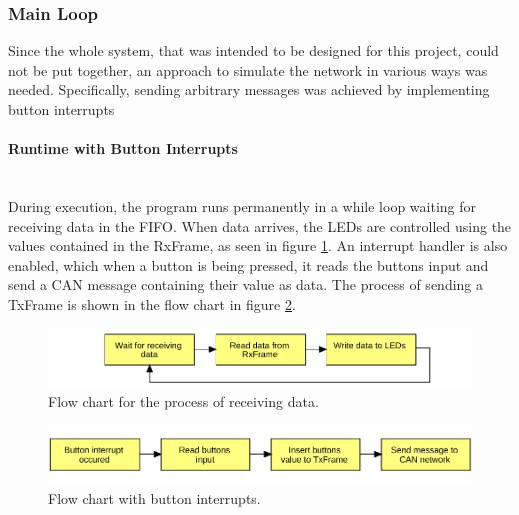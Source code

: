 \subsubsection{Main Loop}
Since the whole system, that was intended to be designed for this project, could not be put together, an approach to simulate the network in various ways was needed.
Specifically, sending arbitrary messages was achieved by implementing button interrupts

\paragraph{Runtime with Button Interrupts}~\\
During execution, the program runs permanently in a while loop waiting for receiving data in the FIFO.
When data arrives, the LEDs are controlled using the values contained in the RxFrame, as seen in figure \ref{fig:FlowChart_CANSoft_RecvData}.
An interrupt handler is also enabled, which when a button is being pressed, it reads the buttons input and send a CAN message containing their value as data. The process of sending a TxFrame is shown in the flow chart in figure \ref{fig:FlowChart_CANSoft_BtnsIntr}.

\begin{figure}[h!]
	\centering
	\includegraphics[width = 1\linewidth]{graphics/FlowChart_CANSoft_RecvData.pdf}
	\caption{Flow chart for the process of receiving data.}
	\label{fig:FlowChart_CANSoft_RecvData}
\end{figure}
\begin{figure}[h!]
	\centering
	\includegraphics[width = 1\linewidth]{graphics/FlowChart_CANSoft_BtnsIntr.pdf}
	\caption{Flow chart with button interrupts.}
	\label{fig:FlowChart_CANSoft_BtnsIntr}
\end{figure}

